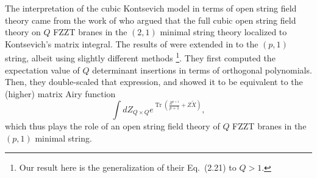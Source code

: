 \documentclass[english]{article}
\DeclareMathOperator{\Tr}{Tr}
\begin{document}
The interpretation of the cubic Kontsevich model in terms of open string field theory came from the work of \cite{Gaiotto:2003yb} who argued that the full cubic open string field theory on $Q$ FZZT branes in the $(2,1)$ minimal string theory localized to Kontsevich's matrix integral. The results of \cite{exact} were extended in \cite{Hashimoto_2005} to the $(p,1)$ string, albeit using slightly different methods \footnote{Our result here is the generalization of their Eq.~(2.21) to $Q>1$.}. They first computed the expectation value of $Q$ determinant insertions in terms of orthogonal polynomials. Then, they double-scaled that expression, and showed it to be equivalent to the (higher) matrix Airy function 
\begin{equation}
    \int dZ_{Q \times Q} e^{\Tr\left( \frac{Z^{p+1}}{p+1} + Z \tilde{X}\right)},
\end{equation}
which thus plays the role of an open string field theory of $Q$ FZZT branes in the $(p,1)$ minimal string. 
\end{document}
